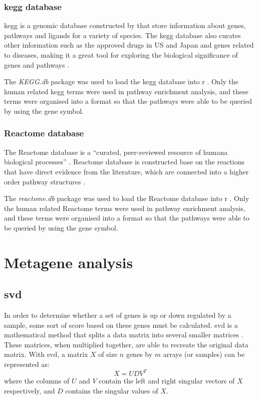 \subsubsection{\gls{kegg} database}
\label{ssub:kegg_database}

\gls{kegg} is a genomic database constructed by \citet{Kanehisa2000} that store information about genes, pathways and ligands for a variety of species.
The \gls{kegg} database also curates other information such as the approved drugs in US and Japan and genes related to diseases, making it a great tool for exploring the biological significance of genes and pathways \citep{Kanehisa2008}.

The \textit{KEGG.db} package was used to load the \gls{kegg} database into \gls{r} \citep{kegg}.
Only the human related \gls{kegg} terms were used in pathway enrichment analysis, and these terms were organised into a format so that the pathways were able to be queried by using the gene symbol.

\subsubsection{Reactome database}
\label{ssub:Reactome_database}

The Reactome database is a ``curated, peer-reviewed resource of humana biological processes'' \citep{Joshi2005}.
Reactome database is constructed base on the reactions that have direct evidence from the literature, which are connected into a higher order pathway structures \citep{Joshi2005}.

The \textit{reactome.db} package was used to load the Reactome database into \gls{r} \citep{reactome}.
Only the human related Reactome terms were used in pathway enrichment analysis, and these terms were organised into a format so that the pathways were able to be queried by using the gene symbol.

\section{Metagene analysis}
\label{sec:metagene_analysis}

\subsection{\Gls{svd}}
\label{sub:svd}

In order to determine whether a set of genes is up or down regulated by a sample, some sort of score based on these genes must be calculated.
\Gls{svd} is a mathematical method that splits a data matrix into several smaller matrices \citep{Golub1970}.
These matrices, when multiplied together, are able to recreate the original data matrix.
With \gls{svd}, a matrix $X$ of size $n$ genes by $m$ arrays (or samples) can be represented as:
\begin{equation}
	\label{eq:svd}
	X = UDV^T
\end{equation}
where the columns of $U$ and $V$ contain the left and right singular vectors of $X$ respectively, and $D$ contains the singular values of $X$.

